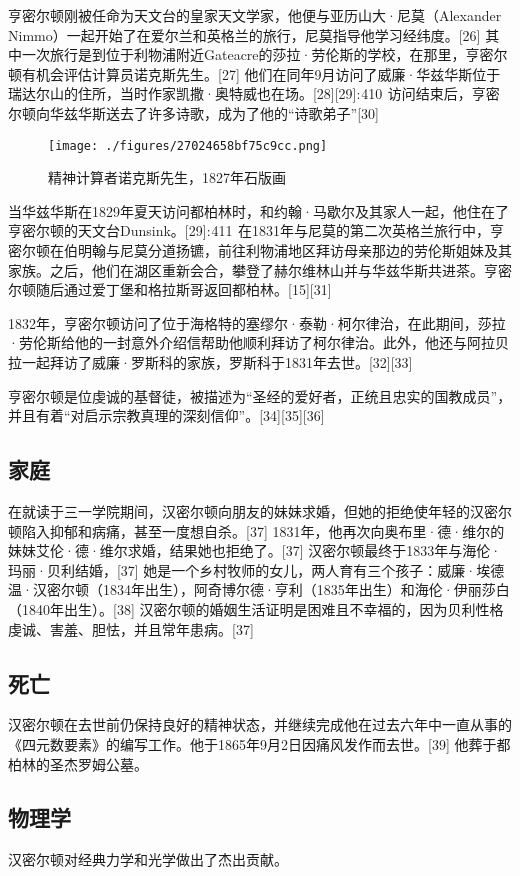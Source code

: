 亨密尔顿刚被任命为天文台的皇家天文学家，他便与亚历山大·尼莫（Alexander Nimmo）一起开始了在爱尔兰和英格兰的旅行，尼莫指导他学习经纬度。[26] 其中一次旅行是到位于利物浦附近Gateacre的莎拉·劳伦斯的学校，在那里，亨密尔顿有机会评估计算员诺克斯先生。[27] 他们在同年9月访问了威廉·华兹华斯位于瑞达尔山的住所，当时作家凯撒·奥特威也在场。[28][29]: 410  访问结束后，亨密尔顿向华兹华斯送去了许多诗歌，成为了他的“诗歌弟子”[30]
\begin{figure}[ht]
\centering
\texttt{[image: ./figures/27024658bf75c9cc.png]}
\caption{精神计算者诺克斯先生，1827年石版画} \label{fig_WLHMD_1}
\end{figure}
当华兹华斯在1829年夏天访问都柏林时，和约翰·马歇尔及其家人一起，他住在了亨密尔顿的天文台Dunsink。[29]: 411  在1831年与尼莫的第二次英格兰旅行中，亨密尔顿在伯明翰与尼莫分道扬镳，前往利物浦地区拜访母亲那边的劳伦斯姐妹及其家族。之后，他们在湖区重新会合，攀登了赫尔维林山并与华兹华斯共进茶。亨密尔顿随后通过爱丁堡和格拉斯哥返回都柏林。[15][31]

1832年，亨密尔顿访问了位于海格特的塞缪尔·泰勒·柯尔律治，在此期间，莎拉·劳伦斯给他的一封意外介绍信帮助他顺利拜访了柯尔律治。此外，他还与阿拉贝拉一起拜访了威廉·罗斯科的家族，罗斯科于1831年去世。[32][33]

亨密尔顿是位虔诚的基督徒，被描述为“圣经的爱好者，正统且忠实的国教成员”，并且有着“对启示宗教真理的深刻信仰”。[34][35][36]
\subsection{家庭}
在就读于三一学院期间，汉密尔顿向朋友的妹妹求婚，但她的拒绝使年轻的汉密尔顿陷入抑郁和病痛，甚至一度想自杀。[37] 1831年，他再次向奥布里·德·维尔的妹妹艾伦·德·维尔求婚，结果她也拒绝了。[37] 汉密尔顿最终于1833年与海伦·玛丽·贝利结婚，[37] 她是一个乡村牧师的女儿，两人育有三个孩子：威廉·埃德温·汉密尔顿（1834年出生），阿奇博尔德·亨利（1835年出生）和海伦·伊丽莎白（1840年出生）。[38] 汉密尔顿的婚姻生活证明是困难且不幸福的，因为贝利性格虔诚、害羞、胆怯，并且常年患病。[37]
\subsection{死亡}
汉密尔顿在去世前仍保持良好的精神状态，并继续完成他在过去六年中一直从事的《四元数要素》的编写工作。他于1865年9月2日因痛风发作而去世。[39] 他葬于都柏林的圣杰罗姆公墓。
\subsection{物理学}
汉密尔顿对经典力学和光学做出了杰出贡献。

